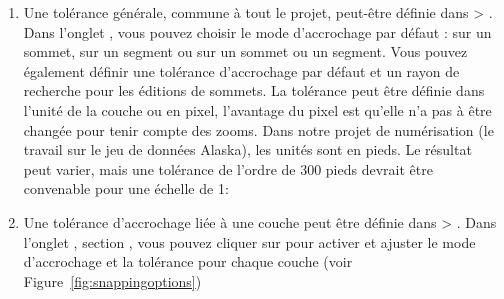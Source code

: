 \begin{enumerate}
\item Une tolérance générale, commune à tout le projet, peut-être définie dans  > . Dans l'onglet , vous pouvez choisir le mode d'accrochage par défaut : sur un sommet, sur un segment ou sur un sommet ou un segment. Vous pouvez également définir une tolérance d'accrochage par défaut et un rayon de recherche pour les éditions de sommets. La tolérance peut être définie dans l'unité de la couche ou en pixel, l'avantage du pixel est qu'elle n'a pas à être changée pour tenir compte des zooms. Dans notre projet de numérisation (le travail sur le jeu de données Alaska), les unités sont en pieds. Le résultat peut varier, mais une tolérance de l'ordre de 300 pieds devrait être convenable pour une échelle de 1:\ieme
\item Une tolérance d'accrochage liée à une couche peut être définie dans  > . Dans l'onglet , section , vous pouvez cliquer sur  pour activer et ajuster le mode d'accrochage et la tolérance pour chaque couche  (voir Figure~\ref{fig:snappingoptions})
\end{enumerate}


